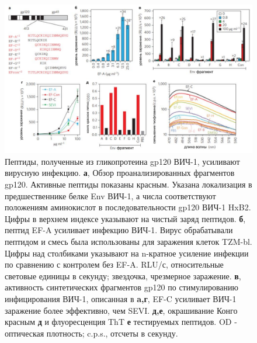     
\begin{figure} [H]
    \centering
    \includegraphics[width=\textwidth]{images/p4/natnanotech2013/nn2013/nn2013_f1.pdf}
    \caption[Пептиды, полученные из гликопротеина gp120 ВИЧ-1, усиливают вирусную инфекцию]{Пептиды, полученные из гликопротеина gp120 ВИЧ-1, усиливают вирусную инфекцию. \textbf{а}, Обзор проанализированных фрагментов gp120. Активные пептиды показаны красным. Указана локализация в предшественнике белке Env ВИЧ-1, а числа соответствуют положениям аминокислот в последовательности gp120 ВИЧ-1 HxB2. Цифры в верхнем индексе указывают на чистый заряд пептидов. \textbf{б}, пептид EF-A усиливает инфекцию ВИЧ-1. Вирус обрабатывали пептидом и смесь была использованы для заражения клеток TZM-bl. Цифры над столбиками указывают на n-кратное усиление инфекции по сравнению с контролем без EF-A. RLU/с, относительные световые единицы в секунду; звездочка, чрезмерное заражение. \textbf{в}, активность синтетических фрагментов gp120 по стимулированию инфицирования ВИЧ-1, описанная в \textbf{a,г}, EF-C усиливает ВИЧ-1 заражение более эффективно, чем SEVI. \textbf{д,е}, окрашивание Конго красным \textbf{д} и флуоресценция ThT \textbf{е} тестируемых пептидов. OD - оптическая плотность; c.p.s., отсчеты в секунду.}
    \label{fig:p4_nn2013_f1}
\end{figure}
    

